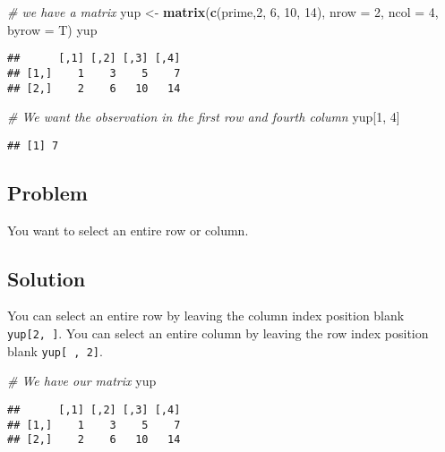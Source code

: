 \documentclass[]{book}
\newenvironment{Shaded}{\begin{snugshade}}{\end{snugshade}}
\newcommand{\KeywordTok}[1]{\textcolor[rgb]{0.13,0.29,0.53}{\textbf{{#1}}}}
\newcommand{\DataTypeTok}[1]{\textcolor[rgb]{0.13,0.29,0.53}{{#1}}}
\newcommand{\DecValTok}[1]{\textcolor[rgb]{0.00,0.00,0.81}{{#1}}}
\newcommand{\StringTok}[1]{\textcolor[rgb]{0.31,0.60,0.02}{{#1}}}
\newcommand{\CommentTok}[1]{\textcolor[rgb]{0.56,0.35,0.01}{\textit{{#1}}}}
\newcommand{\NormalTok}[1]{{#1}}
\begin{document}
\begin{Shaded}
\begin{Highlighting}[]
\CommentTok{# we have a matrix}
\NormalTok{yup <-}\StringTok{ }\KeywordTok{matrix}\NormalTok{(}\KeywordTok{c}\NormalTok{(prime,}\DecValTok{2}\NormalTok{, }\DecValTok{6}\NormalTok{, }\DecValTok{10}\NormalTok{, }\DecValTok{14}\NormalTok{), }\DataTypeTok{nrow =} \DecValTok{2}\NormalTok{, }\DataTypeTok{ncol =} \DecValTok{4}\NormalTok{, }\DataTypeTok{byrow =} \NormalTok{T)}
\NormalTok{yup}
\end{Highlighting}
\end{Shaded}

\begin{verbatim}
##      [,1] [,2] [,3] [,4]
## [1,]    1    3    5    7
## [2,]    2    6   10   14
\end{verbatim}

\begin{Shaded}
\begin{Highlighting}[]
\CommentTok{# We want the observation in the first row and fourth column}
\NormalTok{yup[}\DecValTok{1}\NormalTok{, }\DecValTok{4}\NormalTok{]}
\end{Highlighting}
\end{Shaded}

\begin{verbatim}
## [1] 7
\end{verbatim}

\subsection{Problem}\label{problem-4}

You want to select an entire row or column.

\subsection{Solution}\label{solution-4}

You can select an entire row by leaving the column index position blank
\texttt{yup{[}2,\ {]}}. You can select an entire column by leaving the
row index position blank \texttt{yup{[}\ ,\ 2{]}}.

\begin{Shaded}
\begin{Highlighting}[]
\CommentTok{# We have our matrix}
\NormalTok{yup}
\end{Highlighting}
\end{Shaded}

\begin{verbatim}
##      [,1] [,2] [,3] [,4]
## [1,]    1    3    5    7
## [2,]    2    6   10   14
\end{verbatim}
\end{document}
